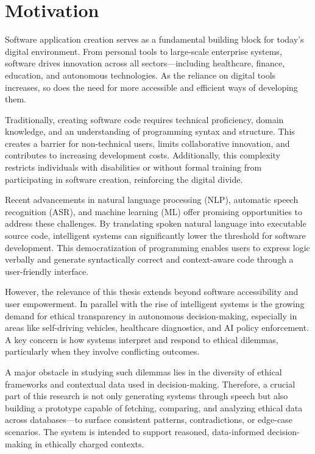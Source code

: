 \chapter*{Motivation}

Software application creation serves as a fundamental building block for today's digital environment. From personal tools to large-scale enterprise systems, software drives innovation across all sectors—including healthcare, finance, education, and autonomous technologies. As the reliance on digital tools increases, so does the need for more accessible and efficient ways of developing them.

Traditionally, creating software code requires technical proficiency, domain knowledge, and an understanding of programming syntax and structure. This creates a barrier for non-technical users, limits collaborative innovation, and contributes to increasing development costs. Additionally, this complexity restricts individuals with disabilities or without formal training from participating in software creation, reinforcing the digital divide.

Recent advancements in natural language processing (NLP), automatic speech recognition (ASR), and machine learning (ML) offer promising opportunities to address these challenges. By translating spoken natural language into executable source code, intelligent systems can significantly lower the threshold for software development. This democratization of programming enables users to express logic verbally and generate syntactically correct and context-aware code through a user-friendly interface.

However, the relevance of this thesis extends beyond software accessibility and user empowerment. In parallel with the rise of intelligent systems is the growing demand for ethical transparency in autonomous decision-making, especially in areas like self-driving vehicles, healthcare diagnostics, and AI policy enforcement. A key concern is how systems interpret and respond to ethical dilemmas, particularly when they involve conflicting outcomes.

A major obstacle in studying such dilemmas lies in the diversity of ethical frameworks and contextual data used in decision-making. Therefore, a crucial part of this research is not only generating systems through speech but also building a prototype capable of fetching, comparing, and analyzing ethical data across databases—to surface consistent patterns, contradictions, or edge-case scenarios. The system is intended to support reasoned, data-informed decision-making in ethically charged contexts.

